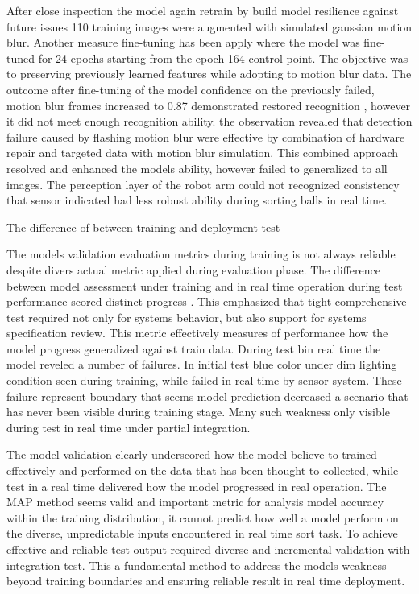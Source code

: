 After close inspection the model again retrain by build model resilience against  future issues 110 training images were augmented with simulated gaussian motion blur. Another measure fine-tuning has been apply where the model was fine-tuned for 24 epochs starting from the epoch 164 control point. The objective was to preserving previously learned features while adopting to motion blur data. The outcome after fine-tuning of the model confidence on the previously failed, motion blur frames increased to 0.87 demonstrated restored recognition , however it did not meet enough recognition ability. the observation revealed that detection failure caused by flashing motion blur were effective by combination of hardware repair and targeted data with motion blur simulation. This combined approach resolved and enhanced the models ability, however failed to generalized to all images. The perception layer of the robot arm could not recognized consistency that sensor indicated had less robust ability during sorting balls in real time. 

The difference of between training and deployment test 

The models validation evaluation metrics during training is not always reliable despite divers actual metric applied during evaluation phase. The difference between model assessment under training and in real time operation during  test performance scored distinct progress . This emphasized that tight comprehensive test required not only for systems behavior, but also support for systems specification review. This metric effectively measures of performance how the model progress generalized against train data. During test bin real time the model reveled a number of failures. In initial test blue color under dim lighting condition seen during training, while failed in real time by sensor system. These failure represent boundary that seems model prediction decreased a scenario that has never been visible during training stage. Many such weakness only visible during test in real time under partial integration.

  The model validation clearly underscored how the model believe to trained effectively and performed on the data that has been thought to collected, while test in a real time delivered how the model progressed in real operation. The MAP method seems valid and important metric for analysis model accuracy within the training distribution, it cannot predict how well a model perform  on the diverse, unpredictable inputs encountered in real time sort task. To achieve effective and reliable test output required diverse and incremental validation with integration test. This a fundamental method to address the models weakness beyond training boundaries and ensuring reliable result in real time deployment.







  
